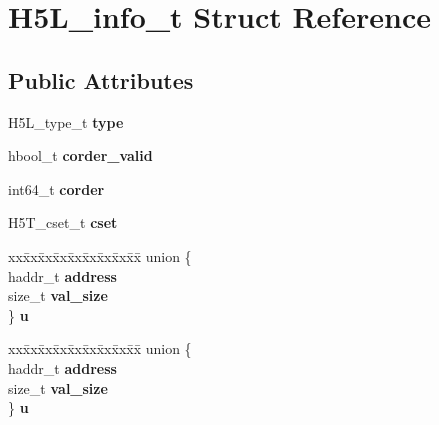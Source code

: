 \hypertarget{struct_h5_l__info__t}{}\section{H5\+L\+\_\+info\+\_\+t Struct Reference}
\label{struct_h5_l__info__t}
\subsection*{Public Attributes}
\begin{DoxyCompactItemize}
\item 
\mbox{\label{struct_h5_l__info__t_a9be0c0ea0b1c9bb5a18b69c260eec048}} 
H5\+L\+\_\+type\+\_\+t {\bfseries type}
\item 
\mbox{\label{struct_h5_l__info__t_a82d49587003c442affb7c0c6220e06a8}} 
hbool\+\_\+t {\bfseries corder\+\_\+valid}
\item 
\mbox{\label{struct_h5_l__info__t_aae0edbfa8b279f1f1c47b86e6cbd5b05}} 
int64\+\_\+t {\bfseries corder}
\item 
\mbox{\label{struct_h5_l__info__t_a56285e7538d9e941dab9f9435f6ae976}} 
H5\+T\+\_\+cset\+\_\+t {\bfseries cset}
\item 
\mbox{\label{struct_h5_l__info__t_af4ee0f824a3d50ecc33fe2d93041e464}} 
\begin{tabbing}
xx\=xx\=xx\=xx\=xx\=xx\=xx\=xx\=xx\=\kill
union \{\\
\>haddr\_t {\bfseries address}\\
\>size\_t {\bfseries val\_size}\\
\} {\bfseries u}\\

\end{tabbing}\item 
\mbox{\label{struct_h5_l__info__t_a3ca4cb8ab46c32cea4e6f41fa03646db}} 
\begin{tabbing}
xx\=xx\=xx\=xx\=xx\=xx\=xx\=xx\=xx\=\kill
union \{\\
\>haddr\_t {\bfseries address}\\
\>size\_t {\bfseries val\_size}\\
\} {\bfseries u}\\

\end{tabbing}\end{DoxyCompactItemize}


